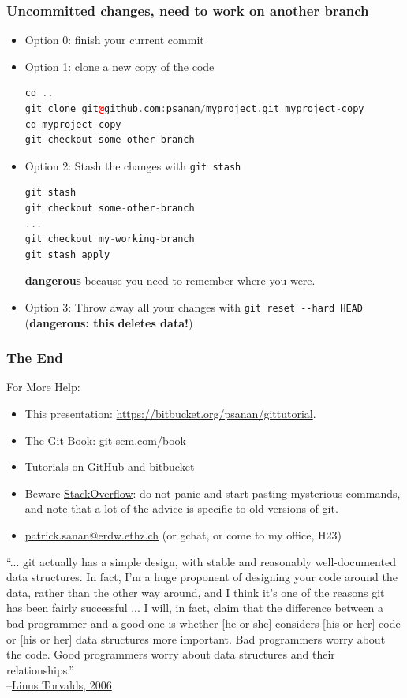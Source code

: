 \documentclass{beamer}
\begin{document}
\begin{frame}[fragile]
\frametitle{Uncommitted changes, need to work on another branch}
\begin{itemize}
\item Option 0: finish your current commit
\item Option 1: clone a new copy of the code
\begin{lstlisting}[language=C++]
cd .. 
git clone git@github.com:psanan/myproject.git myproject-copy
cd myproject-copy
git checkout some-other-branch
\end{lstlisting}
\item Option 2: Stash the changes with \lstinline{git stash}
\begin{lstlisting}[language=C++]
git stash
git checkout some-other-branch
...
git checkout my-working-branch
git stash apply
\end{lstlisting}
\textbf{dangerous} because you need to remember where you were.
\item Option 3: Throw away all your changes with \lstinline{git reset --hard HEAD} (\textbf{dangerous: this deletes data!})
\end{itemize}
\end{frame}

\begin{frame}[fragile]
\frametitle{The End}

For More Help:
\begin{itemize}
\item This presentation: \href{https://bitbucket.org/psanan/gittutorial}{https://bitbucket.org/psanan/gittutorial}. 
\item
The Git Book: \href{https://git-scm.com/book}{git-scm.com/book}
\item 
Tutorials on GitHub and bitbucket
\item 
Beware \href{www.stackoverflow.com}{StackOverflow}: do not panic and start pasting mysterious commands, and note that a lot of the advice is specific to old versions of git.
\item \href{mailto:patrick.sanan@erdw.ethz.ch}{patrick.sanan@erdw.ethz.ch} (or gchat, or come to my office, H23)
\end{itemize}
\vspace{50px}
{\tiny ``... git actually has a simple design, with stable and reasonably well-documented data structures. 
In fact, I'm a huge proponent of designing your code around the data, rather than the other 
way around, and I think it's one of the reasons git has been fairly successful ... I will, in 
fact, claim that the difference between a bad programmer and a good one is whether [he or she] 
considers [his or her] code or [his or her] data structures more important. Bad programmers worry 
about the code. Good programmers worry about data structures and their relationships.''\\
--\href{http://lwn.net/Articles/193245/}{Linus Torvalds, 2006}
}
\end{frame}
\end{document}
